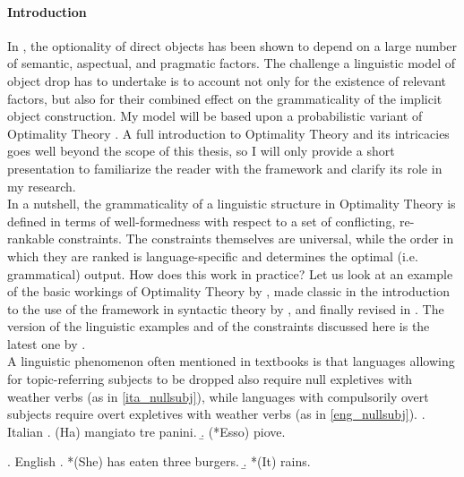 \paragraph{Introduction} In , the optionality of direct objects has been shown to depend on a large number of semantic, aspectual, and pragmatic factors. The challenge a linguistic model of object drop has to undertake is to account not only for the existence of relevant factors, but also for their combined effect on the grammaticality of the implicit object construction. My model will be based upon a probabilistic variant of Optimality Theory \parencite{princesmolensky1993optimality, PrinceSmolensky2008}. A full introduction to Optimality Theory and its intricacies goes well beyond the scope of this thesis, so I will only provide a short presentation to familiarize the reader with the framework and clarify its role in my research.\\ %
In a nutshell, the grammaticality of a linguistic structure in Optimality Theory is defined in terms of well-formedness with respect to a set of conflicting, re-rankable constraints. The constraints themselves are universal, while the order in which they are ranked is language-specific and determines the optimal (i.e. grammatical) output. How does this work in practice? Let us look at an example of the basic workings of Optimality Theory by \textcite{grimshaw1998optimal}, made classic in the introduction to the use of the framework in syntactic theory by \textcite{legendre2001introduction}, and finally revised in \textcite{legendre2019otsyntax}. The version of the linguistic examples and of the constraints discussed here is the latest one by \textcite{legendre2019otsyntax}.\\
A linguistic phenomenon often mentioned in textbooks is that languages allowing for topic-referring subjects to be dropped also require null expletives with weather verbs (as in \ref{ita_nullsubj}), while languages with compulsorily overt subjects require overt expletives with weather verbs (as in \ref{eng_nullsubj}).
\ex. \label{ita_nullsubj} Italian
\a. (Ha) mangiato tre panini.
\b. \label{ita_expletive} (*Esso) piove.

\ex. \label{eng_nullsubj} English
\a. *(She) has eaten three burgers.
\b. \label{eng_expletive} *(It) rains.

